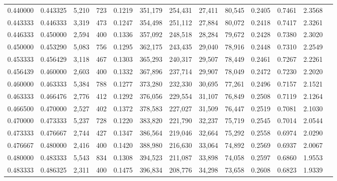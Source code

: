 \begin{tabular}{rrrrrrrrrrrrr}
0.440000 & 0.443325 &  5,210 &   723 &                                     0.1219 & 351,179 & 254,431 &  27,411 &  80,545 & 0.2405 & 0.7461 & 2.3568 \\
0.443333 & 0.446333 &  3,319 &   473 &                                     0.1247 & 354,498 & 251,112 &  27,884 &  80,072 & 0.2418 & 0.7417 & 2.3261 \\
0.446333 & 0.450000 &  2,594 &   400 &                                     0.1336 & 357,092 & 248,518 &  28,284 &  79,672 & 0.2428 & 0.7380 & 2.3020 \\
0.450000 & 0.453290 &  5,083 &   756 &                                     0.1295 & 362,175 & 243,435 &  29,040 &  78,916 & 0.2448 & 0.7310 & 2.2549 \\
0.453333 & 0.456429 &  3,118 &   467 &                                     0.1303 & 365,293 & 240,317 &  29,507 &  78,449 & 0.2461 & 0.7267 & 2.2261 \\
0.456439 & 0.460000 &  2,603 &   400 &                                     0.1332 & 367,896 & 237,714 &  29,907 &  78,049 & 0.2472 & 0.7230 & 2.2020 \\
0.460000 & 0.463333 &  5,384 &   788 &                                     0.1277 & 373,280 & 232,330 &  30,695 &  77,261 & 0.2496 & 0.7157 & 2.1521 \\
0.463333 & 0.466476 &  2,776 &   412 &                                     0.1292 & 376,056 & 229,554 &  31,107 &  76,849 & 0.2508 & 0.7119 & 2.1264 \\
0.466500 & 0.470000 &  2,527 &   402 &                                     0.1372 & 378,583 & 227,027 &  31,509 &  76,447 & 0.2519 & 0.7081 & 2.1030 \\
0.470000 & 0.473333 &  5,237 &   728 &                                     0.1220 & 383,820 & 221,790 &  32,237 &  75,719 & 0.2545 & 0.7014 & 2.0544 \\
0.473333 & 0.476667 &  2,744 &   427 &                                     0.1347 & 386,564 & 219,046 &  32,664 &  75,292 & 0.2558 & 0.6974 & 2.0290 \\
0.476667 & 0.480000 &  2,416 &   400 &                                     0.1420 & 388,980 & 216,630 &  33,064 &  74,892 & 0.2569 & 0.6937 & 2.0067 \\
0.480000 & 0.483333 &  5,543 &   834 &                                     0.1308 & 394,523 & 211,087 &  33,898 &  74,058 & 0.2597 & 0.6860 & 1.9553 \\
0.483333 & 0.486325 &  2,311 &   400 &                                     0.1475 & 396,834 & 208,776 &  34,298 &  73,658 & 0.2608 & 0.6823 & 1.9339 \\

\end{tabular}
